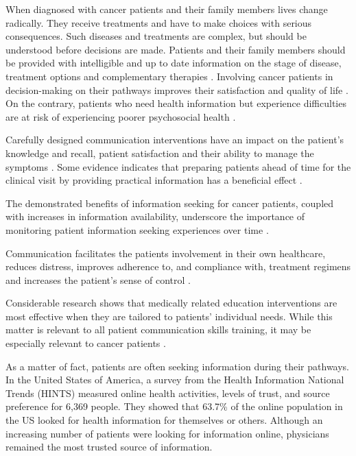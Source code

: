 When diagnosed with cancer patients and their family members lives change radically. They receive treatments and have to make choices with serious consequences. Such diseases and treatments are complex, but should be understood before decisions are made. Patients and their family members should be provided with intelligible and up to date information on the stage of disease, treatment options and complementary therapies \cite{butow_dynamics_1997,cassileth_information_1980}. Involving cancer patients in decision-making on their pathways improves their satisfaction and quality of life \cite{sheabudgell_information_2014}. On the contrary, patients who need health information but experience difficulties are at risk of experiencing poorer psychosocial health \cite{arora_barriers_2002}.

Carefully designed communication interventions have an impact on the patient's knowledge and recall, patient satisfaction and their ability to manage the symptoms \cite{johnson_effects_1982,hack_feasibility_1999,mohide_randomised_1996,mcpherson_effective_2001}. Some evidence indicates that preparing patients ahead of time for the clinical visit by providing practical information has a beneficial effect \cite{huchcroft_testing_1984,cegala_patient_2003}.

The demonstrated benefits of information seeking for cancer patients, coupled with increases in information availability, underscore the importance of monitoring patient information seeking experiences over time \cite{finney_rutten_cancer-related_2016}.

Communication facilitates the patients involvement in their own healthcare, reduces distress, improves adherence to, and compliance with, treatment regimens and increases the patient's sense of control \cite{viswanath_science_2005}.

Considerable research shows that medically related education interventions are most effective when they are tailored to patients' individual needs. While this matter is relevant to all patient communication skills training, it may be especially relevant to cancer patients \cite{cegala_patient_2003}.

As a matter of fact, patients are often seeking information during their pathways. In the United States of America, a survey from the Health Information National Trends (HINTS) \cite{hesse_trust_2005} measured online health activities, levels of trust, and source preference for 6,369 people. They showed that 63.7\% of the online population in the US looked for health information for themselves or others. Although an increasing number of patients were looking for information online, physicians remained the most trusted source of information.

